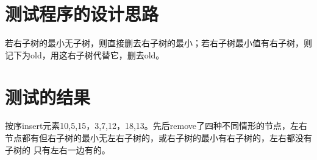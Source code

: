 \documentclass[UTF8]{ctexart}
\begin{document}
\pagestyle{fancy}
\fancyhead{}

\section{测试程序的设计思路}
若右子树的最小无子树，则直接删去右子树的最小；若右子树最小值有右子树，则记下为old，用这右子树代替它，删去old。

\section{测试的结果}

按序insert元素10,5,15，3,7,12，18,13。先后remove了四种不同情形的节点，左右节点都有但右子树的最小无左右子树的，或右子树的最小有右子树的，左右都没有子树的
只有左右一边有的。
\end{document}
